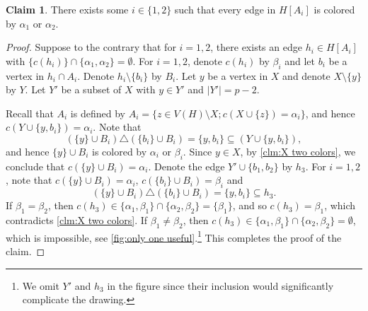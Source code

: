 \documentclass[10pt,a4paper]{article}
\theoremstyle{definition}
\newtheorem{claim}[theorem]{Claim}
\begin{document}
\begin{claim}\label{clm:one special}
    There exists some $i\in\{1,2\}$ such that every edge in $H[A_i]$ is colored by $\alpha_1$ or $\alpha_2$.
\end{claim}
\begin{proof}
    Suppose to the contrary that for $i=1,2$, there exists an edge $h_i\in H[A_i]$ with $\{c(h_i)\}\cap\{\alpha_1,\alpha_2\}=\emptyset$.
    For $i=1,2$, denote $c(h_i)$ by $\beta_i$ and let $b_i$ be a vertex in $h_i\cap A_i$.
    Denote $h_i\setminus\{b_i\}$ by $B_i$.
    Let $y$ be a vertex in $X$ and denote $X\setminus\{y\}$ by $Y$.
    Let $Y'$ be a subset of $X$ with $y\in Y'$ and $|Y'|=p-2$.

    Recall that $A_i$ is defined by $A_i=\{z\in V(H)\setminus X;c(X\cup\{z\})=\alpha_i\}$, and hence $c(Y\cup\{y,b_i\})=\alpha_i$.
    Note that
    \[
        (\{y\}\cup B_i) \triangle (\{b_i\}\cup B_i)=\{y,b_i\}\subseteq (Y\cup\{y,b_i\}),
    \]
    and hence $\{y\}\cup B_i$ is colored by $\alpha_i$ or $\beta_i$.
    Since $y\in X$, by \cref{clm:X two colors}, we conclude that $c(\{y\}\cup B_i)=\alpha_i$.
    Denote the edge $Y'\cup\{b_1,b_2\}$ by $h_3$.
    For $i=1,2$, note that $c(\{y\}\cup B_i)=\alpha_i$, $c(\{b_i\}\cup B_i)=\beta_i$ and
    \[
        (\{y\}\cup B_i) \triangle (\{b_i\}\cup B_i)=\{y,b_i\}\subseteq h_3.
    \]
    If $\beta_1=\beta_2$, then $c(h_3)\in \{\alpha_1,\beta_1\}\cap\{\alpha_2,\beta_2\}=\{\beta_1\}$, and so $c(h_3)=\beta_1$, which contradicts \cref{clm:X two colors}.
    If $\beta_1\ne\beta_2$, then $c(h_3)\in \{\alpha_1,\beta_1\}\cap\{\alpha_2,\beta_2\}=\emptyset$, which is impossible, see \cref{fig:only one useful}.\footnote{We omit $Y'$ and $h_3$ in the figure since their inclusion would significantly complicate the drawing.}
    This completes the proof of the claim.
\end{proof}
\end{document}
